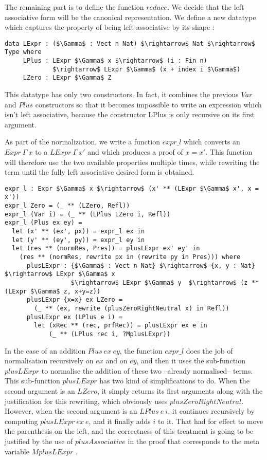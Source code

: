 The remaining part is to define the function $reduce$. We decide that the left associative form will be the canonical representation. We define a new datatype which captures the property of being left-associative by its shape :

\begin{lstlisting}
data LExpr : ($\Gamma$ : Vect n Nat) $\rightarrow$ Nat $\rightarrow$ Type where
     LPlus : LExpr $\Gamma$ x $\rightarrow$ (i : Fin n) 
             $\rightarrow$ LExpr $\Gamma$ (x + index i $\Gamma$)
     LZero : LExpr $\Gamma$ Z
\end{lstlisting}


This datatype has only two constructors. In fact, it combines the previous $Var$ and $Plus$ constructors so that it becomes impossible to write an expression which isn't left associative, because the constructor LPlus is only recursive on its first argument.
 
As part of the normalization, we write a function $expr\_l$ which converts an $Expr\ \Gamma\ x$ to a $LExpr\ \Gamma\ x'$ and which produces a proof of $x=x'$. This function will therefore use the two available properties multiple times, while rewriting the term until the fully left associative desired form is obtained.


\begin{lstlisting}
expr_l : Expr $\Gamma$ x $\rightarrow$ (x' ** (LExpr $\Gamma$ x', x = x'))
expr_l Zero = (_ ** (LZero, Refl))
expr_l (Var i) = (_ ** (LPlus LZero i, Refl))
expr_l (Plus ex ey) = 
  let (x' ** (ex', px)) = expr_l ex in
  let (y' ** (ey', py)) = expr_l ey in
  let (res ** (normRes, Pres)) = plusLExpr ex' ey' in
    (res ** (normRes, rewrite px in (rewrite py in Pres))) where 
      plusLExpr : {$\Gamma$ : Vect n Nat} $\rightarrow$ {x, y : Nat} $\rightarrow$ LExpr $\Gamma$ x 
                  $\rightarrow$ LExpr $\Gamma$ y  $\rightarrow$ (z ** (LExpr $\Gamma$ z, x+y=z))
      plusLExpr {x=x} ex LZero =
        (_ ** (ex, rewrite (plusZeroRightNeutral x) in Refl))            
      plusLExpr ex (LPlus e i) =
        let (xRec ** (rec, prfRec)) = plusLExpr ex e in
            (_ ** (LPlus rec i, ?MplusLExpr))

\end{lstlisting}

In the case of an addition $Plus\ ex\ ey$, the function $expr\_l$ does the job of normalisation recursively on $ex$ and on $ey$, and then it uses the sub-function $plusLExpr$ to normalise the addition of these two --already normalised-- terms. This sub-function $plusLExpr$ has two kind of simplifications to do. When the second argument is an $LZero$, it simply returns its first arguments along with the justification for this rewriting, which obviously uses $plusZeroRightNeutral$. However, when the second argument is an $LPlus\ e\ i$, it continues recursively by computing $plusLExpr\ ex\ e$, and it finally adds $i$ to it. That had for effect to move the parenthesis on the left, and the correctness of this treatment is going to be justified by the use of $plusAssociative$ in the proof that corresponds to the meta variable $MplusLExpr$ .

